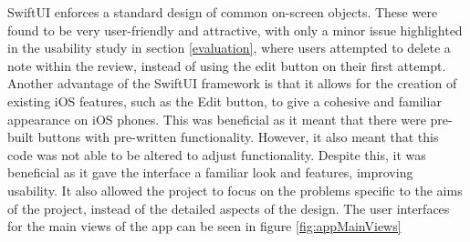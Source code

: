 \documentclass{l4proj}
\begin{document}
SwiftUI enforces a standard design of common on-screen objects. These were found to be very user-friendly and attractive, with only a minor issue highlighted in the usability study in section \ref{evaluation}, where users attempted to delete a note within the review, instead of using the edit button on their first attempt. Another advantage of the SwiftUI framework is that it allows for the creation of existing iOS features, such as the Edit button, to give a cohesive and familiar appearance on iOS phones. This was beneficial as it meant that there were pre-built buttons with pre-written functionality. However, it also meant that this code was not able to be altered to adjust functionality. Despite this, it was beneficial as it gave the interface a familiar look and features, improving usability. It also allowed the project to focus on the problems specific to the aims of the project, instead of the detailed aspects of the design. The user interfaces for the main views of the app can be seen in figure \ref{fig:appMainViews}
\end{document}
